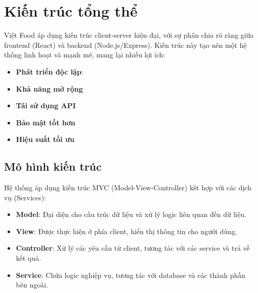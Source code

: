 \section{Kiến trúc tổng thể}

Việt Food áp dụng kiến trúc client-server hiện đại, với sự phân chia rõ ràng giữa frontend (React) và backend (Node.js/Express). Kiến trúc này tạo nên một hệ thống linh hoạt và mạnh mẽ, mang lại nhiều lợi ích:

\begin{itemize}
    \item \textbf{Phát triển độc lập}:
    \item \textbf{Khả năng mở rộng}
    \item \textbf{Tái sử dụng API}
    \item \textbf{Bảo mật tốt hơn}
    \item \textbf{Hiệu suất tối ưu}
\end{itemize}

\subsection{Mô hình kiến trúc}
Hệ thống áp dụng kiến trúc MVC (Model-View-Controller) kết hợp với các dịch vụ (Services):

\begin{itemize}
    \item \textbf{Model}: Đại diện cho cấu trúc dữ liệu và xử lý logic liên quan đến dữ liệu.
    \item \textbf{View}: Được thực hiện ở phía client, hiển thị thông tin cho người dùng.
    \item \textbf{Controller}: Xử lý các yêu cầu từ client, tương tác với các service và trả về kết quả.
    \item \textbf{Service}: Chứa logic nghiệp vụ, tương tác với database và các thành phần bên ngoài.
\end{itemize}

